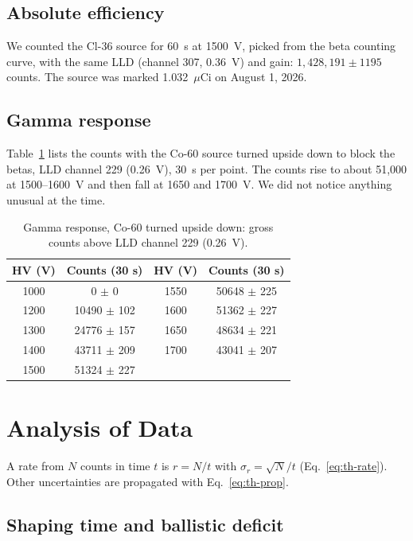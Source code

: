 \documentclass[12pt]{article}
\begin{document}
\subsection{Absolute efficiency}
 
We counted the Cl-36 source for 60~s at 1500~V, picked from the beta counting curve, with the same LLD (channel 307, 0.36~V) and gain: $1{,}428{,}191 \pm 1195$ counts. The source was marked 1.032~$\mu$Ci on August 1, 2026.
 
\subsection{Gamma response}
 
Table~\ref{tab:rawgamma} lists the counts with the Co-60 source turned upside down to block the betas, LLD channel 229 (0.26~V), 30~s per point. The counts rise to about 51,000 at 1500--1600~V and then fall at 1650 and 1700~V. We did not notice anything unusual at the time.
 
\begin{table}[!htbp]
\centering\small
\begin{tabular}{cc|cc}
\toprule
\textbf{HV (V)} & \textbf{Counts (30 s)} & \textbf{HV (V)} & \textbf{Counts (30 s)} \\
\midrule
1000 & 0 $\pm$ 0 & 1550 & 50648 $\pm$ 225 \\
1200 & 10490 $\pm$ 102 & 1600 & 51362 $\pm$ 227 \\
1300 & 24776 $\pm$ 157 & 1650 & 48634 $\pm$ 221 \\
1400 & 43711 $\pm$ 209 & 1700 & 43041 $\pm$ 207 \\
1500 & 51324 $\pm$ 227 & & \\
\bottomrule
\end{tabular}
\caption{Gamma response, Co-60 turned upside down: gross counts above LLD channel 229 (0.26~V).}
\label{tab:rawgamma}
\end{table}
 
\section{Analysis of Data}
\label{sec:analysis}
 
A rate from $N$ counts in time $t$ is $r = N/t$ with $\sigma_r = \sqrt{N}/t$ (Eq.~\ref{eq:th-rate}). Other uncertainties are propagated with Eq.~\ref{eq:th-prop}.
 
\subsection{Shaping time and ballistic deficit}
 
\end{document}
